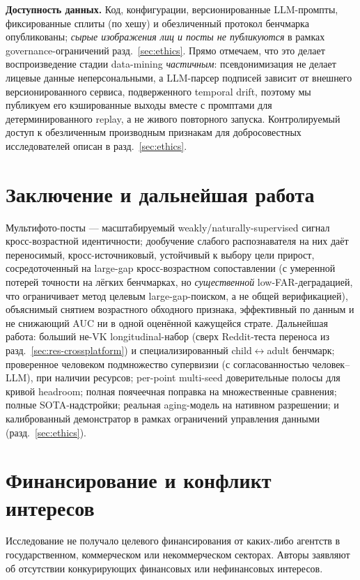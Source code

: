 \documentclass[journal]{IEEEtran}
\begin{document}
\textbf{Доступность данных.} Код, конфигурации, версионированные LLM-промпты, фиксированные сплиты (по хешу) и обезличенный протокол бенчмарка опубликованы; \emph{сырые изображения лиц и посты не публикуются} в рамках governance-ограничений разд.~\ref{sec:ethics}. Прямо отмечаем, что это делает воспроизведение стадии data-mining \emph{частичным}: псевдонимизация не делает лицевые данные неперсональными, а LLM-парсер подписей зависит от внешнего версионированного сервиса, подверженного temporal drift, поэтому мы публикуем его кэшированные выходы вместе с промптами для детерминированного replay, а не живого повторного запуска. Контролируемый доступ к обезличенным производным признакам для добросовестных исследователей описан в разд.~\ref{sec:ethics}.

\section{Заключение и дальнейшая работа}\label{sec:conclusion}
Мультифото-посты --- масштабируемый weakly/naturally-supervised сигнал кросс-возрастной идентичности; дообучение слабого распознавателя на них даёт переносимый, кросс-источниковый, устойчивый к выбору цели прирост, сосредоточенный на large-gap кросс-возрастном сопоставлении (с умеренной потерей точности на лёгких бенчмарках, но \emph{существенной} low-FAR-деградацией, что ограничивает метод целевым large-gap-поиском, а не общей верификацией), объяснимый снятием возрастного обходного признака, эффективный по данным и не снижающий AUC ни в одной оценённой кажущейся страте. Дальнейшая работа: больший не-VK longitudinal-набор (сверх Reddit-теста переноса из разд.~\ref{sec:res-crossplatform}) и специализированный child$\leftrightarrow$adult бенчмарк; проверенное человеком подмножество супервизии (с согласованностью человек--LLM), при наличии ресурсов; per-point multi-seed доверительные полосы для кривой headroom; полная поячеечная поправка на множественные сравнения; полные SOTA-надстройки; реальная aging-модель на нативном разрешении; и калиброванный демонстратор в рамках ограничений управления данными (разд.~\ref{sec:ethics}).

\section*{Финансирование и конфликт интересов}
Исследование не получало целевого финансирования от каких-либо агентств в государственном, коммерческом или некоммерческом секторах. Авторы заявляют об отсутствии конкурирующих финансовых или нефинансовых интересов.



\end{document}
